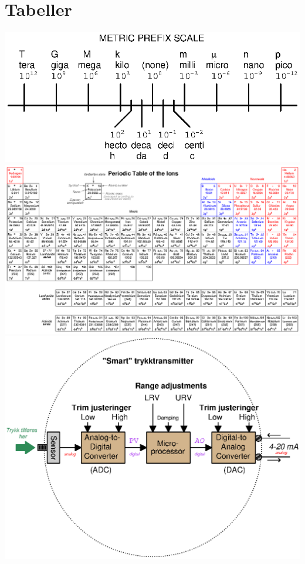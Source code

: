 \documentclass[10pt,a5paper]{article}
\begin{document}
\section{Tabeller}
\includegraphics[width=1\textwidth]{002.eps}
\vfil \eject
\includegraphics[angle=90,height=1\textheight]{./chemistry12.eps}
\vfil \eject
\includegraphics[width=1\textwidth]{calibrate03.eps}
\end{document}
